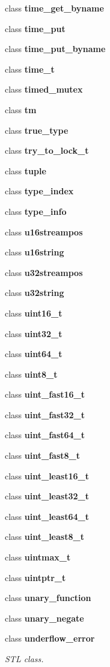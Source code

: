 \begin{DoxyCompactItemize}
class \textbf{ time\+\_\+get\+\_\+byname}
\item 
class \textbf{ time\+\_\+put}
\item 
class \textbf{ time\+\_\+put\+\_\+byname}
\item 
class \textbf{ time\+\_\+t}
\item 
class \textbf{ timed\+\_\+mutex}
\item 
class \textbf{ tm}
\item 
class \textbf{ true\+\_\+type}
\item 
class \textbf{ try\+\_\+to\+\_\+lock\+\_\+t}
\item 
class \textbf{ tuple}
\item 
class \textbf{ type\+\_\+index}
\item 
class \textbf{ type\+\_\+info}
\item 
class \textbf{ u16streampos}
\item 
class \textbf{ u16string}
\item 
class \textbf{ u32streampos}
\item 
class \textbf{ u32string}
\item 
class \textbf{ uint16\+\_\+t}
\item 
class \textbf{ uint32\+\_\+t}
\item 
class \textbf{ uint64\+\_\+t}
\item 
class \textbf{ uint8\+\_\+t}
\item 
class \textbf{ uint\+\_\+fast16\+\_\+t}
\item 
class \textbf{ uint\+\_\+fast32\+\_\+t}
\item 
class \textbf{ uint\+\_\+fast64\+\_\+t}
\item 
class \textbf{ uint\+\_\+fast8\+\_\+t}
\item 
class \textbf{ uint\+\_\+least16\+\_\+t}
\item 
class \textbf{ uint\+\_\+least32\+\_\+t}
\item 
class \textbf{ uint\+\_\+least64\+\_\+t}
\item 
class \textbf{ uint\+\_\+least8\+\_\+t}
\item 
class \textbf{ uintmax\+\_\+t}
\item 
class \textbf{ uintptr\+\_\+t}
\item 
class \textbf{ unary\+\_\+function}
\item 
class \textbf{ unary\+\_\+negate}
\item 
class \textbf{ underflow\+\_\+error}
\begin{DoxyCompactList}\small\item\em S\+TL class. \end{DoxyCompactList}\item 

\end{DoxyCompactItemize}
